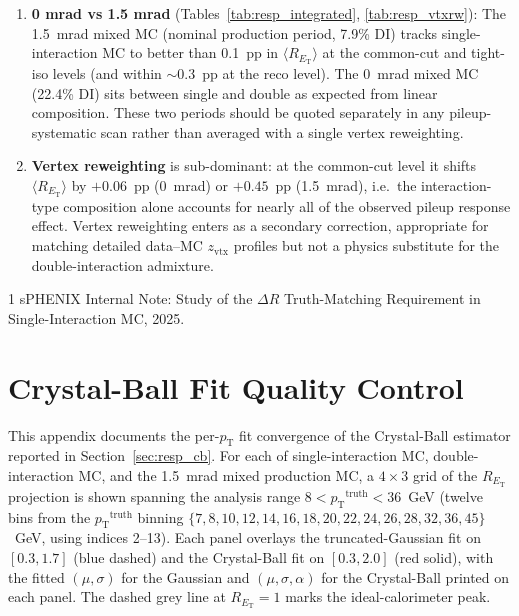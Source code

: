 \documentclass[11pt,letterpaper]{article}
\newcommand{\DR}{\ensuremath{\Delta R}}
\newcommand{\pT}{\ensuremath{p_{\text{T}}}}
\newcommand{\ET}{\ensuremath{E_{\text{T}}}}
\newcommand{\zvtx}{\ensuremath{z_{\mathrm{vtx}}}}
\begin{document}
\begin{enumerate}
  \item \textbf{0 mrad vs 1.5 mrad} (Tables~\ref{tab:resp_integrated},
    \ref{tab:resp_vtxrw}): The 1.5~mrad mixed MC (nominal production
    period, 7.9\% DI) tracks single-interaction MC to better than 0.1~pp
    in $\langle R_{\ET}\rangle$ at the common-cut and tight-iso levels
    (and within $\sim$0.3~pp at the reco level). The 0~mrad mixed MC
    (22.4\% DI) sits between single and double as expected from linear
    composition. These two periods should be quoted separately in any
    pileup-systematic scan rather than averaged with a single vertex
    reweighting.

  \item \textbf{Vertex reweighting} is sub-dominant: at the common-cut
    level it shifts $\langle R_{\ET}\rangle$ by $+0.06$~pp (0~mrad) or
    $+0.45$~pp (1.5~mrad), i.e.\ the interaction-type composition alone
    accounts for nearly all of the observed pileup response effect.
    Vertex reweighting enters as a secondary correction, appropriate for
    matching detailed data--MC $\zvtx$ profiles but not a physics
    substitute for the double-interaction admixture.
\end{enumerate}

\begin{thebibliography}{1}
 sPHENIX Internal Note: Study of the $\DR$ Truth-Matching
  Requirement in Single-Interaction MC, 2025.
\end{thebibliography}


\appendix

\section{Crystal-Ball Fit Quality Control}
\label{app:fit_qc}

This appendix documents the per-\pT{} fit convergence of the
Crystal-Ball estimator reported in Section~\ref{sec:resp_cb}. For each
of single-interaction MC, double-interaction MC, and the 1.5~mrad mixed
production MC, a $4\times 3$ grid of the $R_{\ET}$ projection is shown
spanning the analysis range $8 < \pT^{\text{truth}} < 36$~GeV (twelve
bins from the $\pT^{\text{truth}}$ binning
$\{7, 8, 10, 12, 14, 16, 18, 20, 22, 24, 26, 28, 32, 36, 45\}$~GeV,
using indices 2--13). Each panel overlays the truncated-Gaussian fit on
$[0.3, 1.7]$ (blue dashed) and the Crystal-Ball fit on $[0.3, 2.0]$ (red
solid), with the fitted $(\mu, \sigma)$ for the Gaussian and
$(\mu, \sigma, \alpha)$ for the Crystal-Ball printed on each panel.
The dashed grey line at $R_{\ET} = 1$ marks the ideal-calorimeter peak.
\end{document}
